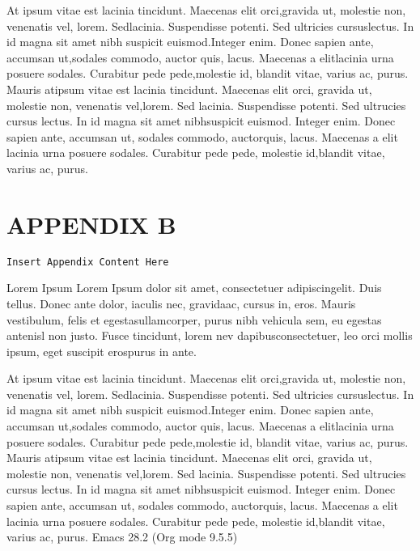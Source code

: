 \documentclass[openleft,oneside,showtrims]{memoir}
\begin{document}
At ipsum vitae est lacinia tincidunt. Maecenas elit orci,gravida ut, molestie non, venenatis vel, lorem. Sedlacinia. Suspendisse potenti. Sed ultricies cursuslectus. In id magna sit amet nibh suspicit euismod.Integer enim. Donec sapien ante, accumsan ut,sodales commodo, auctor quis, lacus. Maecenas a elitlacinia urna posuere sodales. Curabitur pede pede,molestie id, blandit vitae, varius ac, purus. Mauris atipsum vitae est lacinia tincidunt. Maecenas elit orci, gravida ut, molestie non, venenatis vel,lorem. Sed lacinia. Suspendisse potenti. Sed ultrucies cursus lectus. In id magna sit amet nibhsuspicit euismod. Integer enim. Donec sapien ante, accumsan ut, sodales commodo, auctorquis, lacus. Maecenas a elit lacinia urna posuere sodales. Curabitur pede pede, molestie id,blandit vitae, varius ac, purus.

\chapter{APPENDIX B}
\label{sec:org5ec399a}

\texttt{Insert Appendix Content Here}

Lorem Ipsum Lorem Ipsum dolor sit amet, consectetuer adipiscingelit. Duis tellus. Donec ante dolor, iaculis nec, gravidaac, cursus in, eros. Mauris vestibulum, felis et egestasullamcorper, purus nibh vehicula sem, eu egestas antenisl non justo. Fusce tincidunt, lorem nev dapibusconsectetuer, leo orci mollis ipsum, eget suscipit erospurus in ante.

At ipsum vitae est lacinia tincidunt. Maecenas elit orci,gravida ut, molestie non, venenatis vel, lorem. Sedlacinia. Suspendisse potenti. Sed ultricies cursuslectus. In id magna sit amet nibh suspicit euismod.Integer enim. Donec sapien ante, accumsan ut,sodales commodo, auctor quis, lacus. Maecenas a elitlacinia urna posuere sodales. Curabitur pede pede,molestie id, blandit vitae, varius ac, purus. Mauris atipsum vitae est lacinia tincidunt. Maecenas elit orci, gravida ut, molestie non, venenatis vel,lorem. Sed lacinia. Suspendisse potenti. Sed ultrucies cursus lectus. In id magna sit amet nibhsuspicit euismod. Integer enim. Donec sapien ante, accumsan ut, sodales commodo, auctorquis, lacus. Maecenas a elit lacinia urna posuere sodales. Curabitur pede pede, molestie id,blandit vitae, varius ac, purus.
Emacs 28.2 (Org mode 9.5.5)
\end{document}
